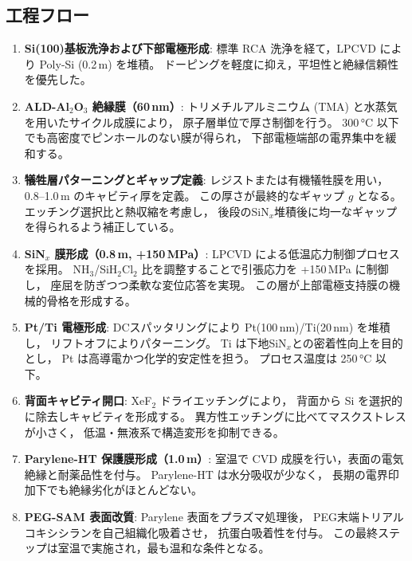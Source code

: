 \subsection{工程フロー}
\begin{enumerate}[label=(\arabic*), leftmargin=6mm]
\item \textbf{Si(100)基板洗浄および下部電極形成}:  
標準 RCA 洗浄を経て，LPCVD により Poly-Si (0.2\,\textmu m) を堆積。
ドーピングを軽度に抑え，平坦性と絶縁信頼性を優先した。

\item \textbf{ALD-Al$_2$O$_3$ 絶縁膜（60\,nm）}:  
トリメチルアルミニウム (TMA) と水蒸気を用いたサイクル成膜により，
原子層単位で厚さ制御を行う。  
300\,\si{\celsius} 以下でも高密度でピンホールのない膜が得られ，
下部電極端部の電界集中を緩和する。

\item \textbf{犠牲層パターニングとギャップ定義}:  
レジストまたは有機犠牲膜を用い，0.8--1.0\,\textmu m のキャビティ厚を定義。
この厚さが最終的なギャップ $g$ となる。
エッチング選択比と熱収縮を考慮し，
後段のSiN$_x$堆積後に均一なギャップを得られるよう補正している。

\item \textbf{SiN$_x$ 膜形成（0.8\,\textmu m, +150\,MPa）}:  
LPCVD による低温応力制御プロセスを採用。
NH$_3$/SiH$_2$Cl$_2$ 比を調整することで引張応力を +150\,MPa に制御し，
座屈を防ぎつつ柔軟な変位応答を実現。
この層が上部電極支持膜の機械的骨格を形成する。

\item \textbf{Pt/Ti 電極形成}:  
DCスパッタリングにより Pt(100\,nm)/Ti(20\,nm) を堆積し，
リフトオフによりパターニング。
Ti は下地SiN$_x$との密着性向上を目的とし，
Pt は高導電かつ化学的安定性を担う。
プロセス温度は 250\,\si{\celsius} 以下。

\item \textbf{背面キャビティ開口}:  
XeF$_2$ ドライエッチングにより，
背面から Si を選択的に除去しキャビティを形成する。
異方性エッチングに比べてマスクストレスが小さく，
低温・無液系で構造変形を抑制できる。

\item \textbf{Parylene-HT 保護膜形成（1.0\,\textmu m）}:  
室温で CVD 成膜を行い，表面の電気絶縁と耐薬品性を付与。
Parylene-HT は水分吸収が少なく，
長期の電界印加下でも絶縁劣化がほとんどない。

\item \textbf{PEG-SAM 表面改質}:  
Parylene 表面をプラズマ処理後，
PEG末端トリアルコキシシランを自己組織化吸着させ，
抗蛋白吸着性を付与。
この最終ステップは室温で実施され，最も温和な条件となる。
\end{enumerate}

